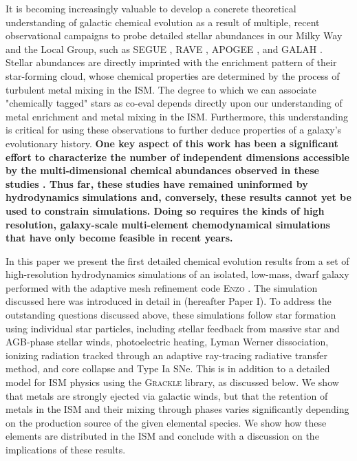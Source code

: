\documentclass[twocolumn]{aastex61}
\begin{document}
It is becoming increasingly valuable to develop a concrete theoretical understanding of galactic chemical evolution as a result of multiple, recent observational campaigns to probe detailed stellar abundances in our Milky Way and the Local Group, such as SEGUE \citep{Yanny2009}, RAVE \citep{Kunder2017}, APOGEE \citep{Anders2014}, and GALAH \citep{Buder2018}. Stellar abundances are directly imprinted with the enrichment pattern of their star-forming cloud, whose chemical properties are determined by the process of turbulent metal mixing in the ISM. The degree to which we can associate "chemically tagged" stars as co-eval depends directly upon our understanding of metal enrichment and metal mixing in the ISM. Furthermore, this understanding is critical for using these observations to further deduce properties of a galaxy's evolutionary history. 
\textbf{One key aspect of this work has been a significant effort to characterize the number of independent dimensions accessible by the multi-dimensional chemical abundances observed in these studies \citep[e.g][]{Ting2012, Hogg2016,Jofre2017,Price-Jones2018}. Thus far, these studies have remained uninformed by hydrodynamics simulations and, conversely, these results cannot yet be used to constrain simulations. Doing so requires the kinds of high resolution, galaxy-scale multi-element chemodynamical simulations that have only become feasible in recent years.}

In this paper we present the first detailed chemical evolution results from a set of high-resolution hydrodynamics simulations of an isolated, low-mass, dwarf galaxy performed with the adaptive mesh refinement code \textsc{Enzo} \citep{Enzo2014}. The simulation discussed here was introduced in detail in \cite{Emerick2018} (hereafter Paper I). To address the outstanding questions discussed above, these simulations follow star formation using individual star particles, including stellar feedback from massive star and AGB-phase stellar winds, photoelectric heating, Lyman Werner dissociation, ionizing radiation tracked through an adaptive ray-tracing radiative transfer method, and core collapse and Type Ia SNe. This is in addition to a detailed model for ISM physics using the \textsc{Grackle} library, as discussed below. We show that metals are strongly ejected via galactic winds, but that the retention of metals in the ISM and their mixing through phases varies significantly depending on the production source of the given elemental species. We show how these elements are distributed in the ISM and conclude with a discussion on the implications of these results.
\end{document}
